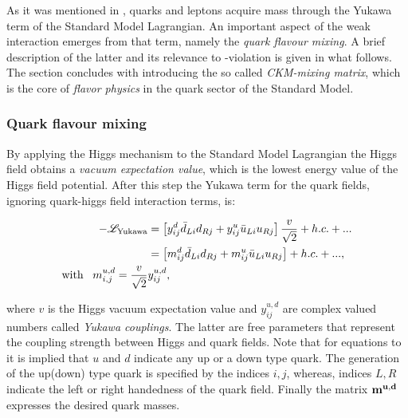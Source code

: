 As it was mentioned in , quarks and leptons acquire mass through the Yukawa term
of the Standard Model Lagrangian. An important aspect of the weak interaction emerges from that term,
namely the {\it quark flavour mixing}. A brief description of the latter and its relevance to \CP-violation 
is given in what follows. The section concludes with introducing the so called {\it CKM-mixing matrix}, 
which is the core of {\it flavor physics} in the quark sector of the Standard Model.

\subsubsection{Quark flavour mixing}
By applying the Higgs mechanism \cite{PhysRevLett.13.321,PhysRevLett.13.508} to the Standard Model Lagrangian the Higgs field obtains a
{\it vacuum expectation value}, which is the lowest energy value of the Higgs field potential.
After this step the Yukawa term for the quark fields, ignoring quark-higgs field interaction terms, is:

\begin{subequations}
\label{yukawa_flavour}
\centering
  \begin{align}
  -\mathscr{L}_{\text{Yukawa}} &= \left[ y_{ij}^d \bar{d}_{Li} d_{Rj} + y_{ij}^u \bar{u}_{Li} u_{Rj} \right] \frac{v}{\sqrt{2}} + h.c. + ...  \\
                               &= \left[ m_{ij}^d \bar{d}_{Li} d_{Rj} + m_{ij}^u \bar{u}_{Li} u_{Rj} \right] + h.c. + ...,  \\
                               \text{with} \;\;\; m^{u,d}_{i,j} = \frac{v}{\sqrt{2}} & y_{ij}^{u,d}, \nonumber
  \end{align}
\end{subequations}

\noindent where $v$ is the Higgs vacuum expectation value and $y_{ij}^{u,d}$ are complex valued numbers called {\it Yukawa couplings}.
The latter are free parameters that represent the coupling strength between Higgs and quark fields.
Note that for equations  to  it is implied that $u$ and $d$ indicate
any up or a down type quark. The generation of the up(down) type quark is specified by the indices $i,j$,
whereas, indices $L,R$ indicate the left or right handedness of the quark field.
Finally the matrix $\bf m^{u,d}$ expresses the desired quark masses.

